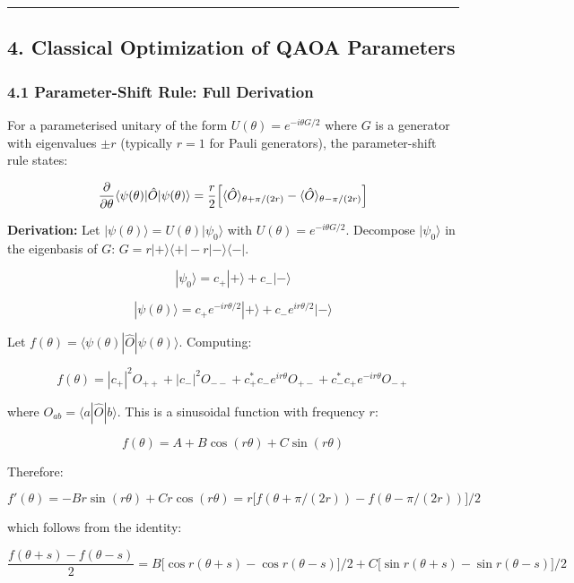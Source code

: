 \documentclass[
  11pt,
]{report}
\begin{document}
\begin{center}\rule{0.5\linewidth}{0.5pt}\end{center}

\subsection{4. Classical Optimization of QAOA
Parameters}\label{classical-optimization-of-qaoa-parameters}

\subsubsection{4.1 Parameter-Shift Rule: Full
Derivation}\label{parameter-shift-rule-full-derivation}

For a parameterised unitary of the form \(U(\theta) = e^{-i\theta G/2}\)
where \(G\) is a generator with eigenvalues \(\pm r\) (typically
\(r = 1\) for Pauli generators), the parameter-shift rule states:

\[\frac{\partial}{\partial \theta}\langle \psi(\theta) | \hat{O} | \psi(\theta)\rangle = \frac{r}{2}\Bigl[\langle \hat{O}\rangle_{\theta + \pi/(2r)} - \langle \hat{O}\rangle_{\theta - \pi/(2r)}\Bigr]\]

\textbf{Derivation:} Let
\(|\psi(\theta)\rangle = U(\theta)|\psi_0\rangle\) with
\(U(\theta) = e^{-i\theta G/2}\). Decompose \(|\psi_0\rangle\) in the
eigenbasis of \(G\):
\(G = r|+\rangle\langle +| - r|-\rangle\langle -|\).

\[|\psi_0\rangle = c_+|+\rangle + c_-|-\rangle\]

\[|\psi(\theta)\rangle = c_+ e^{-ir\theta/2}|+\rangle + c_- e^{ir\theta/2}|-\rangle\]

Let \(f(\theta) = \langle\psi(\theta)|\hat{O}|\psi(\theta)\rangle\).
Computing:

\[f(\theta) = |c_+|^2 O_{++} + |c_-|^2 O_{--} + c_+^* c_- e^{ir\theta} O_{+-} + c_- ^* c_+ e^{-ir\theta} O_{-+}\]

where \(O_{ab} = \langle a|\hat{O}|b\rangle\). This is a sinusoidal
function with frequency \(r\):

\[f(\theta) = A + B\cos(r\theta) + C\sin(r\theta)\]

Therefore:

\[f'(\theta) = -Br\sin(r\theta) + Cr\cos(r\theta) = r\bigl[f(\theta + \pi/(2r)) - f(\theta - \pi/(2r))\bigr] / 2\]

which follows from the identity:

\[\frac{f(\theta + s) - f(\theta - s)}{2} = B\bigl[\cos r(\theta+s) - \cos r(\theta-s)\bigr]/2 + C\bigl[\sin r(\theta + s) - \sin r(\theta-s)\bigr]/2\]
\end{document}
